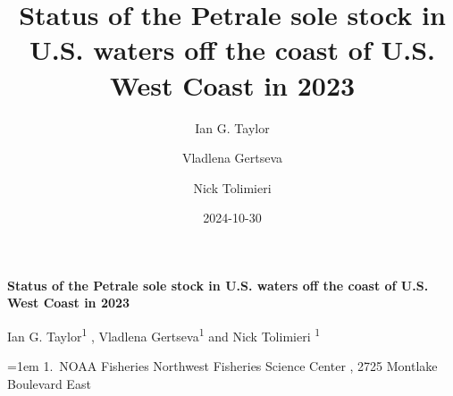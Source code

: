 \documentclass[
]{scrartcl}
\title{Status of the Petrale sole stock in U.S. waters off the coast of
U.S. West Coast in 2023}
\author{Ian G. Taylor \and Vladlena Gertseva \and Nick Tolimieri}
\date{2024-10-30}
\begin{document}
  \begin{titlepage}

  \begin{minipage}[b][\textheight][s]{\textwidth}
  \raggedright




  {\huge\bfseries\nohyphens{Status of the Petrale sole stock in U.S.
  waters off the coast of U.S. West Coast in 2023}}\\[1\baselineskip]


  \vspace{1\baselineskip}


  \vspace{1\baselineskip}

   {\large{Ian G. Taylor}}{\textsuperscript{1}}%
  ,
   {\large{Vladlena Gertseva}}{\textsuperscript{1}}%
  { and \large{Nick Tolimieri}}%
  {\textsuperscript{1}}%



  \vspace{2\baselineskip}

  \hangindent=1em
  {1}.~{NOAA Fisheries Northwest Fisheries Science Center}%
  , %
  {2725 Montlake Boulevard East}%


  \vspace{1\baselineskip}



  \vfill



\end{minipage}
\end{titlepage}
\end{document}
